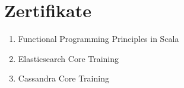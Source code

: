 \section*{Zertifikate}
\begin{enumerate}[label=,leftmargin=0cm,itemsep=10pt]
\item Functional Programming Principles in Scala
\item Elasticsearch Core Training
\item Cassandra Core Training

\end{enumerate}
